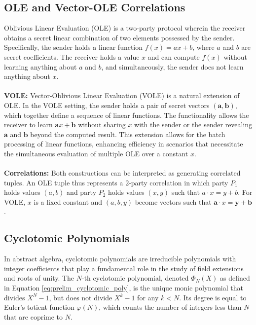 \subsection{OLE and Vector-OLE Correlations}
\label{prelim:OLE_VOLE}
Oblivious Linear Evaluation (OLE) is a two-party protocol wherein the receiver obtains a secret linear combination of two elements possessed by the sender. Specifically, the sender holds a linear function $f(x) = ax + b$, where $a$ and $b$ are secret coefficients. The receiver holds a value $x$ and can compute $f(x)$ without learning anything about $a$ and $b$, and simultaneously, the sender does not learn anything about $x$.
\\\\
\textbf{VOLE:} Vector-Oblivious Linear Evaluation (VOLE) is a natural extension of OLE. In the VOLE setting, the sender holds a pair of secret vectors \((\mathbf{a}, \mathbf{b})\), which together define a sequence of linear functions. The functionality allows the receiver to learn \(\mathbf{a}x + \mathbf{b}\) without sharing \(x\) with the sender or the sender revealing \(\mathbf{a}\) and \(\mathbf{b}\) beyond the computed result. This extension allows for the batch processing of linear functions, enhancing efficiency in scenarios that necessitate the simultaneous evaluation of multiple OLE over a constant $x$.
\\\\
\textbf{Correlations:} Both constructions can be interpreted as generating correlated tuples. An OLE tuple thus represents a 2-party correlation in which party $P_1$ holds values $(a, b)$ and party $P_2$ holds values $(x, y)$ such that $a\cdot x = y+b$. For VOLE, $x$ is a fixed constant and $(a, b, y)$ become vectors such that $\mathbf{a}\cdot x = \mathbf{y}+\mathbf{b}$.

\subsection{Cyclotomic Polynomials}
\label{prelim:cyclotomicPolys}
In abstract algebra, cyclotomic polynomials are irreducible polynomials with integer coefficients that play a fundamental role in the study of field extensions and roots of unity. The $N$-th cyclotomic polynomial, denoted $\Phi_N(X)$ as defined in Equation \ref{eq:prelim_cyclotomic_poly}, is the unique monic polynomial that divides $X^N - 1$, but does not divide $X^k - 1$ for any $k < N$. Its degree is equal to Euler's totient function $\varphi(N)$, which counts the number of integers less than $N$ that are coprime to $N$.

